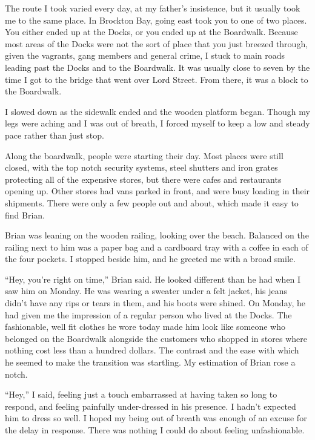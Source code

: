 The route I took varied every day, at my father's insistence, but it usually took me to the same place.  In Brockton Bay, going east took you to one of two places.  You either ended up at the Docks, or you ended up at the Boardwalk.  Because most areas of the Docks were not the sort of place that you just breezed through, given the vagrants, gang members and general crime, I stuck to main roads leading past the Docks and to the Boardwalk.  It was usually close to seven by the time I got to the bridge that went over Lord Street.  From there, it was a block to the Boardwalk.



I slowed down as the sidewalk ended and the wooden platform began.  Though my legs were aching and I was out of breath, I forced myself to keep a low and steady pace rather than just stop.



Along the boardwalk, people were starting their day.  Most places were still closed, with the top notch security systems, steel shutters and iron grates protecting all of the expensive stores, but there were cafes and restaurants opening up.  Other stores had vans parked in front, and were busy loading in their shipments.  There were only a few people out and about, which made it easy to find Brian.



Brian was leaning on the wooden railing, looking over the beach.  Balanced on the railing next to him was a paper bag and a cardboard tray with a coffee in each of the four pockets.  I stopped beside him, and he greeted me with a broad smile.



``Hey, you're right on time,'' Brian said.  He looked different than he had when I saw him on Monday.  He was wearing a sweater under a felt jacket, his jeans didn't have any rips or tears in them, and his boots were shined.  On Monday, he had given me the impression of a regular person who lived at the Docks.  The fashionable, well fit clothes he wore today made him look like someone who belonged on the Boardwalk alongside the customers who shopped in stores where nothing cost less than a hundred dollars.  The contrast and the ease with which he seemed to make the transition was startling.  My estimation of Brian rose a notch.



``Hey,'' I said, feeling just a touch embarrassed at having taken so long to respond, and feeling painfully under-dressed in his presence.  I hadn't expected him to dress so well.  I hoped my being out of breath was enough of an excuse for the delay in response.  There was nothing I could do about feeling unfashionable.



